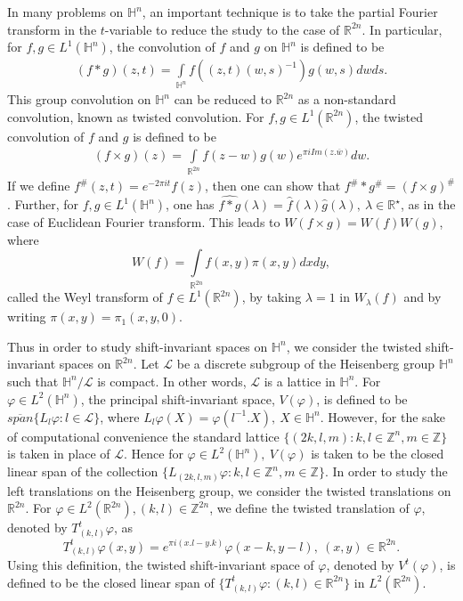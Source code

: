 \documentclass[a4paper,12pt,reqno]{amsart}
\theoremstyle{plain}
\numberwithin{equation}{section}
\theoremstyle{definition}
\newcounter {own}
\begin{document}
In many problems on $\mathbb{H}^{n}$, an important technique is to take the partial Fourier transform in the $t$-variable to reduce the study to the case of $\mathbb{R}^{2n}$. In particular, for $f,g\in L^{1}(\mathbb{H}^{n})$, the convolution of $f$ and $g$ on $\mathbb{H}^{n}$ is defined to be
\begin{eqnarray*}
(f*g)(z,t)=\int\limits_{\mathbb{H}^{n}}f((z,t)(w,s)^{-1})g(w,s)dwds.
\end{eqnarray*}
This group convolution on $\mathbb{H}^{n}$ can be reduced to $\mathbb{R}^{2n}$ as a non-standard convolution, known as twisted convolution. For $f,g\in L^{1}(\mathbb{R}^{2n})$, the twisted convolution of  $f$ and $g$ is defined to be 
\begin{eqnarray*}
(f\times g)(z)=\int\limits_{\mathbb{R}^{2n}} f(z-w)g(w)e^{\pi i Im (z.\overline{w})}dw.
\end{eqnarray*}
If we define $f^{\#}(z,t)=e^{-2\pi it}f(z)$, then one can show that $f^{\#}* g^{\#}=(f\times g)^{\#}$. Further, for $f,g\in L^{1}(\mathbb{H}^{n})$, one has $\widehat{f*g}(\lambda)=\widehat{f}(\lambda)\widehat{g}(\lambda),~\lambda\in\mathbb{R}^{\star} $, as in the case of Euclidean Fourier transform. This leads to $W(f\times g)= W(f) W(g)$, where 
$$W(f)=\int\limits_{\mathbb{R}^{2n}}f(x,y)\pi(x,y)dxdy,$$ called the Weyl transform of $f\in L^{1}(\mathbb{R}^{2n})$, by taking $\lambda=1$ in $W_{\lambda}(f)$ and by writing $\pi (x,y)=\pi_{1}(x,y,0)$.

Thus in order to study shift-invariant spaces on $\mathbb{H}^{n}$, we consider the twisted shift-invariant spaces on $\mathbb{R}^{2n}$. Let $\mathscr{L}$ be a discrete subgroup of the Heisenberg group $\mathbb{H}^{n}$ such that $\mathbb{H}^{n}/\mathscr{L}$ is compact. In other words, $\mathscr{L}$ is a lattice in $\mathbb{H}^{n}$. For $\varphi\in L^{2}(\mathbb{H}^{n})$, the principal shift-invariant space, $V(\varphi)$, is defined to be  $\overline{span}\{{L_{l}\varphi:l\in\mathscr{L}}\}$, where
$L_{l}\varphi(X)=\varphi(l^{-1}.X),~X\in\mathbb{H}^{n}$. However, for the sake of computational convenience the standard lattice $\{(2k,l,m):k,l\in\mathbb{Z}^{n},m\in\mathbb{Z}\}$ is taken in place of $\mathscr{L}$. Hence for $\varphi\in L^{2}(\mathbb{H}^{n}),~V(\varphi)$ is taken to be the closed linear span of the collection $\{L_{(2k,l,m)}\varphi:k,l\in\mathbb{Z}^{n}, m\in\mathbb{Z}\}$. In order to study the left translations on the Heisenberg group, we consider the twisted translations on $\mathbb{R}^{2n}$. For $\varphi\in L^{2}(\mathbb{R}^{2n}), (k,l)\in\mathbb{Z}^{2n}$, we define the twisted translation of $\varphi$, denoted by $T_{(k,l)}^{t}\varphi$, as
$$T_{(k,l)}^{t}\varphi (x,y)= e^{\pi i(x.l-y.k)}\varphi (x-k,y-l),~(x,y)\in\mathbb{R}^{2n}.$$
Using this definition, the twisted shift-invariant space of $\varphi$, denoted by $V^{t}(\varphi)$, is  defined to be the closed linear span of $\{T_{(k,l)}^{t}\varphi: (k,l)\in\mathbb{R}^{2n}\}$ in $L^{2}(\mathbb{R}^{2n})$.
\end{document}
